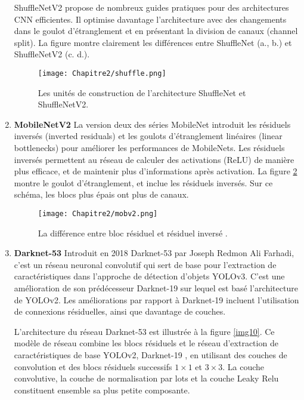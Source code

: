\begin{enumerate}
ShuffleNetV2 propose de nombreux guides pratiques pour des architectures CNN efficientes. Il optimise davantage l’architecture avec des changements dans le goulot d’étranglement et en présentant la division de canaux (channel split). La figure montre clairement les différences entre ShuffleNet (a., b.) et ShuffleNetV2 (c. d.).

\begin{figure}[H]
\centering
  \texttt{[image: Chapitre2/shuffle.png]} 
   \caption{Les unités de construction de l'architecture ShuffleNet  \cite{shufflenet2018} et ShuffleNetV2\cite{shufflenetV2}.}
   \label{shuffle}
 \end{figure}
 
\item \textbf{MobileNetV2 } \cite{mobilenetv2}
La version deux des séries MobileNet introduit les résiduels inversés (inverted residuals) et les goulots d'étranglement linéaires (linear bottlenecks) pour améliorer les performances de MobileNets. Les résiduels inversés permettent au réseau de calculer des activations (ReLU) de manière plus efficace, et de maintenir plus d’informations après activation. La figure \ref{mobv2} montre le goulot d'étranglement, et inclue les résiduels inversés. Sur ce schéma, les blocs plus épais ont plus de canaux. 

\begin{figure}[H]
\centering
  \texttt{[image: Chapitre2/mobv2.png]} 
   \caption{La différence entre bloc résiduel \cite{mobilenet}
et résiduel inversé \cite{mobilenetv2}.}
   \label{mobv2}
 \end{figure}
 
\item \textbf{Darknet-53} \cite{yolov3_paper}
Introduit en 2018 Darknet-53 par Joseph Redmon Ali Farhadi, c'est un réseau neuronal convolutif qui sert de base pour l'extraction de caractéristiques dans l'approche de détection d'objets YOLOv3. C'est une amélioration de son prédécesseur Darknet-19 sur lequel est basé l'architecture de YOLOv2.
Les améliorations par rapport à Darknet-19 incluent l'utilisation de connexions résiduelles, ainsi que davantage de couches.

L'architecture du réseau Darknet-53 est illustrée à la figure \ref{img10}. Ce modèle de réseau combine les blocs résiduels et le réseau d'extraction de caractéristiques de base YOLOv2, Darknet-19 \cite{yolov3_paper}, en utilisant des couches de convolution et des blocs résiduels successifs $1\times 1$ et $3\times 3$. La couche convolutive, la couche de normalisation par lots et la couche Leaky Relu constituent ensemble sa plus petite composante.


\end{enumerate}
